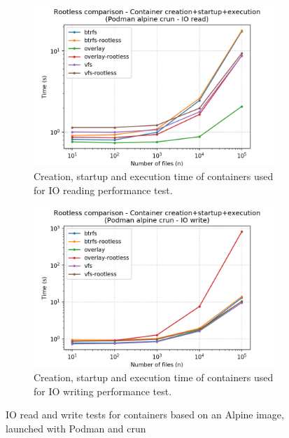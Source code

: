 \begin{figure}[h!]
    \begin{subfigure}{.5\textwidth}
      \centering
      \includegraphics[width=\linewidth]{images/rootless/rootless-full-Podman-alpine-crun---IO-read.png}
      \caption{Creation, startup and execution time of containers used for IO reading performance test.}
      \label{fig:rootless:io-read-full}
    \end{subfigure}
    \begin{subfigure}{.5\textwidth}
      \centering
      \includegraphics[width=\linewidth]{images/rootless/rootless-full-Podman-alpine-crun---IO-write.png}
      \caption{Creation, startup and execution time of containers used for IO writing performance test.}
      \label{fig:rootless:io-write-full}
    \end{subfigure}
    
    \caption{IO read and write tests for containers based on an Alpine image, launched with Podman and crun}
    \label{fig:rootless:db}
\end{figure}


